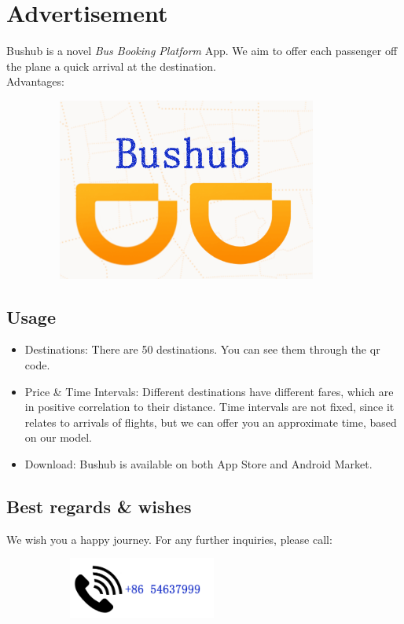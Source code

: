 \documentclass{mcmthesis}
\begin{document}
\section{Advertisement}
Bushub is a novel \emph{Bus Booking Platform} App. We aim to offer each passenger off the plane a quick arrival at the destination. \\
Advantages:
\begin{figure}[htbp]
    \centering
    \includegraphics[height=6cm,width=10cm]{figures/Bushublogo.png}
\end{figure}

\subsection{Usage}
\begin{itemize}
\item Destinations: There are 50 destinations. You can see them through the qr code.
\item Price \& Time Intervals: Different destinations have different fares, which are in positive correlation to their distance. Time intervals are not fixed, since it relates to arrivals of flights, but we can offer you an approximate time, based on our model.
\item Download: Bushub is available on both App Store and Android Market.
\end{itemize}
\subsection{Best regards \& wishes}
We wish you a happy journey. For any further inquiries, please call:
\begin{figure}[hbtp]
    \centering
    \includegraphics[height=2cm,width=7cm]{figures/Bushubtele.png}
\end{figure}
\end{document}
